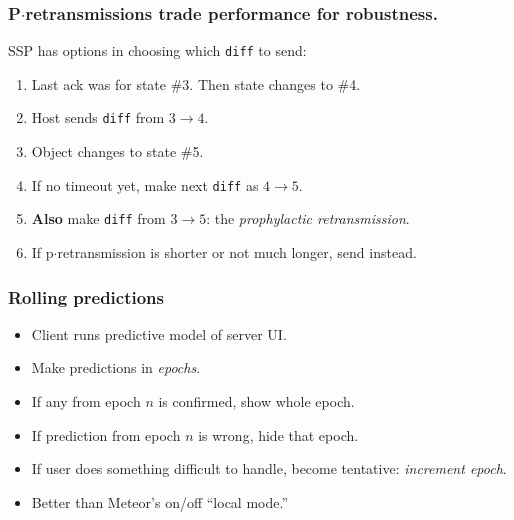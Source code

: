 \documentclass[svgnames]{beamer}
\begin{document}
\begin{frame}
\frametitle{P$\cdot$retransmissions trade performance for robustness.}

SSP has options in choosing which \texttt{diff} to send:

\begin{enumerate}

\item Last ack was for state \#3. Then state changes to \#4.

\item Host sends \texttt{diff} from $3 \rightarrow 4$.

\item Object changes to state \#5.

\item If no timeout yet, make next \texttt{diff} as $4
  \rightarrow 5$.

\item \textbf{Also} make \texttt{diff} from $3 \rightarrow
  5$: the \emph{prophylactic retransmission}.

\item If p$\cdot$retransmission is shorter or not much longer, send instead.

\end{enumerate}

\end{frame}

\begin{frame}
\frametitle{Rolling predictions}

\begin{itemize}

\item Client runs predictive model of server UI.

\item Make predictions in \emph{epochs}.

\item If any from epoch $n$ is confirmed, show whole epoch.

\item If prediction from epoch $n$ is wrong, hide that epoch.


\item If user does something difficult to handle, become
  tentative: \emph{increment epoch}.

\item Better than Meteor's on/off ``local mode.''

\end{itemize}

\end{frame}
\end{document}
